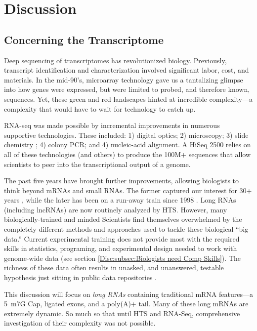 \chapter{Discussion} 
\label{Disc}
\section{Concerning the Transcriptome}
  \label{Disc:sec:Future of Dynamic long RNAs}

  Deep sequencing of transcriptomes has revolutionized biology. Previously, transcript identification and characterization involved significant labor, cost, and materials. In the mid-90's, microarray technology \citep{Schena1995a} gave us a tantalizing glimpse into how genes were expressed, but were limited to probed, and therefore known, sequences. Yet, these green and red landscapes hinted at incredible complexity---a complexity that would have to wait for technology to catch up.

  RNA-seq was made possible by incremental improvements in numerous supportive technologies. These included: 1) digital optics; 2) microscopy; 3) slide chemistry ; 4) colony PCR; and 4) nucleic-acid alignment. A HiSeq 2500 relies on all of these technologies (and others) to produce the 100M+ sequences that allow scientists to peer into the transcriptional output of a genome.

  The past five years have brought further improvements, allowing biologists to think beyond mRNAs and small RNAs. The former captured our interest for 30+ years \citep{Furuichi1975,Wei1975}, while the later has been on a run-away train since 1998 \citep{Fire1998}. Long RNAs (including lncRNAs) are now routinely analyzed by HTS. However, many biologically-trained and minded Scientists find themselves overwhelmed by the completely different methods and approaches used to tackle these biological ``big data.'' Current experimental training does not provide most with the required skills in statistics, programing, and experimental design needed to work with genome-wide data (see section \ref{Disc:subsec:Biologists need Comp Skills}). The richness of these data often results in unasked, and unanswered, testable hypothesis just sitting in public data repositories \citep{Plocik2013}.

  This discussion will focus on \textit{long RNAs} containing traditional mRNA features---a 5\textprime~m7G Cap, ligated exons, and a poly(A)+ tail. Many of these long mRNAs are extremely dynamic. So much so that until HTS and RNA-Seq, comprehensive investigation of their complexity was not possible.

